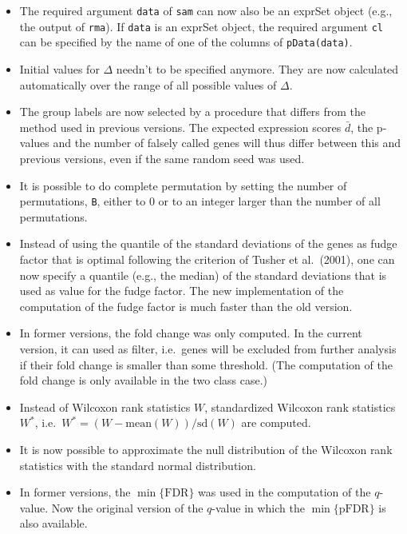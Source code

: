 \documentclass[a4paper]{article}
\begin{document}
\begin{itemize}
\item The required argument \texttt{data} of \texttt{sam} can now also be an exprSet
object (e.g., the output of \texttt{rma}). If \texttt{data} is an exprSet object, the
required argument \texttt{cl} can be specified by the name of one of the columns of
\texttt{pData(data)}.

\item Initial values for $\Delta$ needn't to be specified anymore. They are now calculated
automatically over the range of all possible values of $\Delta$.


\item The group labels are now selected by a procedure that differs from the method used in previous
versions. The expected expression scores $\bar{d}$, the p-values and the number of falsely
called genes will thus differ between this and previous versions, even if the same random seed
was used.

\item It is possible to do complete permutation by setting the number of permutations, \texttt{B},
either to 0 or to an integer larger than the number of all permutations.

\item Instead of using the quantile of the standard deviations of the genes as fudge factor that is optimal following
the criterion of Tusher et al.\ (2001), one can now specify a quantile (e.g., the median) of
the standard deviations that is used as value for the fudge factor. The new implementation of
the computation of the fudge factor is much faster than the old version.

\item In former versions, the fold change was only computed. In the current version, it can
used as filter, i.e.\ genes will be excluded from further analysis if their fold change
is smaller than some threshold. (The computation of the fold change is only available in the
two class case.)

\item Instead of Wilcoxon rank statistics $W$, standardized Wilcoxon rank statistics $W^*$, i.e.\
$W^*=(W-\text{mean}(W))/\text{sd}(W)$ are computed.

\item It is now possible to approximate the null distribution of the Wilcoxon rank statistics
with the standard normal distribution.

\item In former versions, the $\min\{\text{FDR}\}$ was used in the computation of the $q$-value.
Now the original version of the $q$-value in which the $\min\{\text{pFDR}\}$ is also available.


\end{itemize}
\end{document}
